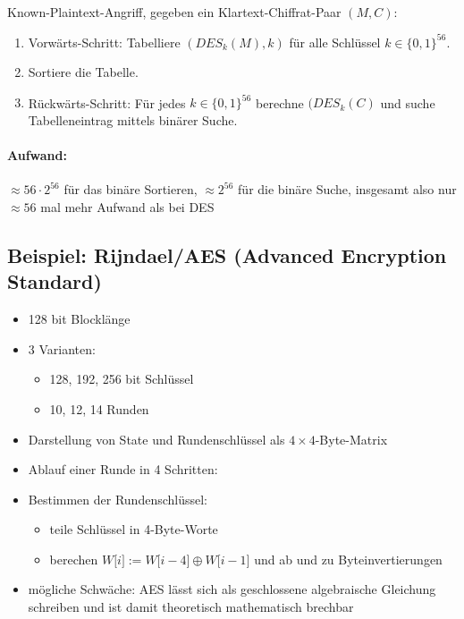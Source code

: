 \documentclass[a4paper,twoside,DIV15,BCOR12mm]{scrbook}
\begin{document}
\\

Known-Plaintext-Angriff, gegeben ein Klartext-Chiffrat-Paar $(M, C)$:

\begin{enumerate}
	\item Vorwärts-Schritt: Tabelliere $({DES}_k(M), k)$ für alle Schlüssel $k \in { \{ 0, 1\} }^{56}$.
	\item Sortiere die Tabelle.
	\item Rückwärts-Schritt: Für jedes $k \in { \{ 0, 1\} }^{56}$ berechne $({DES}_k(C)$ und suche Tabelleneintrag mittels binärer Suche.
\end{enumerate}

\paragraph{Aufwand:} $\approx 56 \cdot 2^{56}$ für das binäre Sortieren, $\approx 2^{56}$ für die binäre Suche, insgesamt also nur $\approx 56$ mal mehr Aufwand als bei DES

\subsection{Beispiel: Rijndael/AES (Advanced Encryption Standard)}

\begin{itemize}
	\item 128 bit Blocklänge
	\item 3 Varianten:
		\begin{itemize}
			\item 128, 192, 256 bit Schlüssel
			\item 10, 12, 14 Runden
		\end{itemize}
	\item Darstellung von State und Rundenschlüssel als $4 \times 4$-Byte-Matrix
	\item Ablauf einer Runde in 4 Schritten: 
	\item Bestimmen der Rundenschlüssel:
		\begin{itemize}
			\item teile Schlüssel in 4-Byte-Worte
			\item berechen $W\lbrack i \rbrack := W\lbrack i-4 \rbrack \oplus W\lbrack i-1 \rbrack$ und ab und zu Byteinvertierungen
		\end{itemize}
	\item mögliche Schwäche: AES lässt sich als geschlossene algebraische Gleichung schreiben und ist damit theoretisch mathematisch brechbar
\end{itemize}
\end{document}
